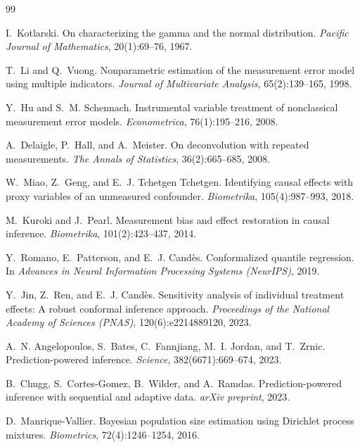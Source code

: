 \documentclass[11pt]{article}
\theoremstyle{definition}
\theoremstyle{remark}
\begin{document}
\begin{thebibliography}{99}

I.~Kotlarski.
\newblock On characterizing the gamma and the normal distribution.
\newblock \emph{Pacific Journal of Mathematics}, 20(1):69--76, 1967.

T.~Li and Q.~Vuong.
\newblock Nonparametric estimation of the measurement error model using
multiple indicators.
\newblock \emph{Journal of Multivariate Analysis}, 65(2):139--165, 1998.

Y.~Hu and S.~M. Schennach.
\newblock Instrumental variable treatment of nonclassical measurement error
models.
\newblock \emph{Econometrica}, 76(1):195--216, 2008.

A.~Delaigle, P.~Hall, and A.~Meister.
\newblock On deconvolution with repeated measurements.
\newblock \emph{The Annals of Statistics}, 36(2):665--685, 2008.

W.~Miao, Z.~Geng, and E.~J. Tchetgen Tchetgen.
\newblock Identifying causal effects with proxy variables of an unmeasured
confounder.
\newblock \emph{Biometrika}, 105(4):987--993, 2018.

M.~Kuroki and J.~Pearl.
\newblock Measurement bias and effect restoration in causal inference.
\newblock \emph{Biometrika}, 101(2):423--437, 2014.

Y.~Romano, E.~Patterson, and E.~J. Cand\`es.
\newblock Conformalized quantile regression.
\newblock In \emph{Advances in Neural Information Processing Systems (NeurIPS)},
2019.

Y.~Jin, Z.~Ren, and E.~J. Cand\`es.
\newblock Sensitivity analysis of individual treatment effects: A robust
conformal inference approach.
\newblock \emph{Proceedings of the National Academy of Sciences (PNAS)},
120(6):e2214889120, 2023.

A.~N. Angelopoulos, S.~Bates, C.~Fannjiang, M.~I. Jordan, and T.~Zrnic.
\newblock Prediction-powered inference.
\newblock \emph{Science}, 382(6671):669--674, 2023.

B.~Chugg, S.~Cortes-Gomez, B.~Wilder, and A.~Ramdas.
\newblock Prediction-powered inference with sequential and adaptive data.
\newblock \emph{arXiv preprint}, 2023.

D.~Manrique-Vallier.
\newblock Bayesian population size estimation using Dirichlet process
mixtures.
\newblock \emph{Biometrics}, 72(4):1246--1254, 2016.


\end{thebibliography}
\end{document}
